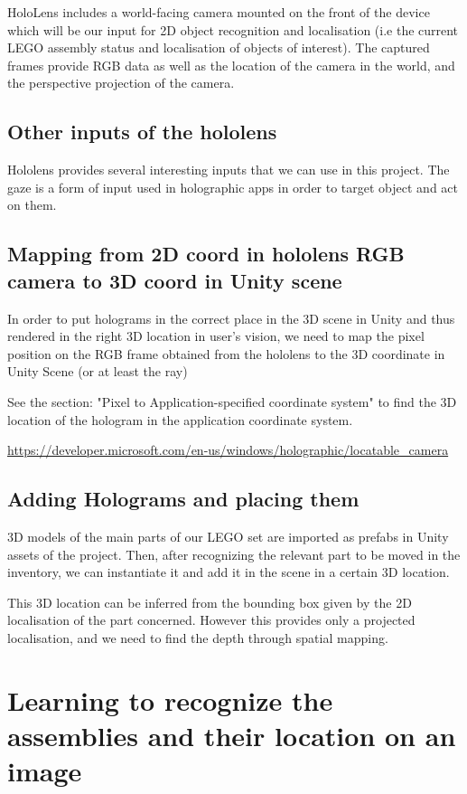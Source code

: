 HoloLens includes a world-facing camera mounted on the front of the device which will be our input for 2D object recognition and localisation (i.e the current LEGO assembly status and localisation of objects of interest). The captured frames provide RGB data as well as the location of the camera in the world, and the perspective projection of the camera. 

\subsection{Other inputs of the hololens}

Hololens provides several interesting inputs that we can use in this project. The gaze is a form of input used in holographic apps in order to target object and act on them. 


\subsection{Mapping from 2D coord in hololens RGB camera to 3D coord in Unity scene}

In order to put holograms in the correct place in the 3D scene in Unity and thus rendered in the right 3D location in user's vision, we need to map the pixel position on the RGB frame obtained from the hololens to the 3D coordinate in Unity Scene (or at least the ray)

See the section: "Pixel to Application-specified coordinate system" to find the 3D location of the hologram in the application coordinate system.

\url{https://developer.microsoft.com/en-us/windows/holographic/locatable_camera}

\subsection{Adding Holograms and placing them}
3D models of the main parts of our LEGO set are imported as prefabs in Unity assets of the project. Then, after recognizing the relevant part to be moved in the inventory, we can instantiate it and add it in the scene in a certain 3D location.

This 3D location can be inferred from the bounding box given by the 2D localisation of the part concerned. However this provides only a projected localisation, and we need to find the depth through spatial mapping.

\section{Learning to recognize the assemblies and their location on an image}

